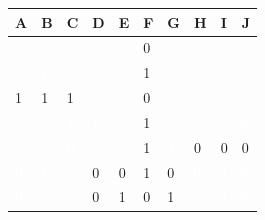 \begin{table}[h]
\begin{tabular}{|l|l|l|l|l|l|l|l|l|l|}
\hline
\cellcolor{grauinfo}A&\cellcolor{grauinfo}B&\cellcolor{grauinfo}C&\cellcolor{grauinfo}D&\cellcolor{grauinfo}E &\cellcolor{grauinfo}F&\cellcolor{grauinfo}G&\cellcolor{grauinfo}H&\cellcolor{grauinfo}I&\cellcolor{grauinfo}J\\ \hline
\cellcolor{red1}\textcolor{white}{0} & \cellcolor{red1}\textcolor{white}{0} & \cellcolor{red1}\textcolor{white}{0} & \cellcolor{red2}\textcolor{white}{0} & \cellcolor{red2}\textcolor{white}{0} & 0 & \cellcolor{red2}\textcolor{white}{0} & \cellcolor{red3}\textcolor{white}{0} & \cellcolor{red3}\textcolor{white}{0} & \cellcolor{red3}\textcolor{white}{0} \\ \hline
\cellcolor{red1}\textcolor{white}{1} & \cellcolor{red1}\textcolor{white}{1} & \cellcolor{red1}\textcolor{white}{1} & \cellcolor{red2}\textcolor{white}{1} & \cellcolor{red2}\textcolor{white}{1} & 1 & \cellcolor{red2}\textcolor{white}{1} & \cellcolor{red3}\textcolor{white}{1} & \cellcolor{red3}\textcolor{white}{1} & \cellcolor{red3}\textcolor{white}{1} \\ \hline
1 & 1 & 1 & \cellcolor{red2}\textcolor{white}{0} & \cellcolor{red2}\textcolor{white}{1} & 0 & \cellcolor{red2}\textcolor{white}{0} & \cellcolor{red3}\textcolor{white}{0} & \cellcolor{red3}\textcolor{white}{0} & \cellcolor{red3}\textcolor{white}{1} \\ \hline
\cellcolor{red1}\textcolor{white}{1} & \cellcolor{red1}\textcolor{white}{0} & \cellcolor{red1}\textcolor{white}{1} & \cellcolor{red2}\textcolor{white}{1} & \cellcolor{red2}\textcolor{white}{0} & 1 & \cellcolor{red2}\textcolor{white}{0} & \cellcolor{red3}\textcolor{white}{1} & \cellcolor{red3}\textcolor{white}{0} & \cellcolor{red3}\textcolor{white}{0} \\ \hline
\cellcolor{red1}\textcolor{white}{1} & \cellcolor{red1}\textcolor{white}{0} & \cellcolor{red1}\textcolor{white}{0} & \cellcolor{red2}\textcolor{white}{0} & \cellcolor{red2}\textcolor{white}{1} & 1 & \cellcolor{red2}\textcolor{white}{1} & 0 & 0 & 0 \\ \hline
\cellcolor{red1}\textcolor{white}{0} & \cellcolor{red1}\textcolor{white}{1} & \cellcolor{red1}\textcolor{white}{1} & 0 & 0 & 1 & 0 & \cellcolor{red3}\textcolor{white}{0} & \cellcolor{red3}\textcolor{white}{1} & \cellcolor{red3}\textcolor{white}{0} \\ \hline
\cellcolor{red1}\textcolor{white}{0} & \cellcolor{red1}\textcolor{white}{0} & \cellcolor{red1}\textcolor{white}{1} & 0 & 1 & 0 & 1 & \cellcolor{red3}\textcolor{white}{1} & \cellcolor{red3}\textcolor{white}{1} & \cellcolor{red3}\textcolor{white}{0} \\ \hline

\end{tabular}
\end{table}
